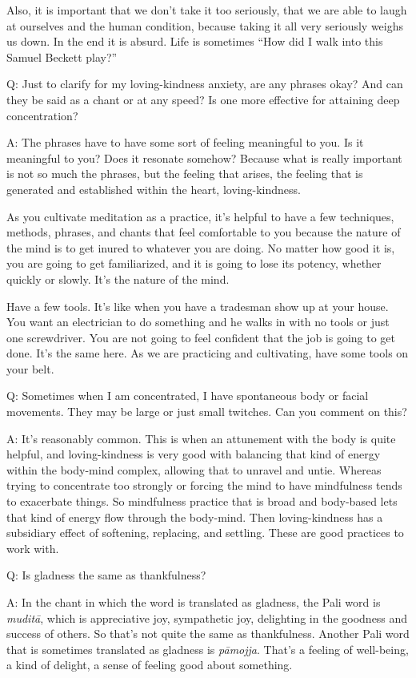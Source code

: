 Also, it is important that we don’t take it too seriously, that we are
able to laugh at ourselves and the human condition, because taking it
all very seriously weighs us down. In the end it is absurd. Life is
sometimes “How did I walk into this Samuel Beckett play?”

\qaspace
Q: Just to clarify for my loving-kindness anxiety, are any phrases okay?
And can they be said as a chant or at any speed? Is one more effective
for attaining deep concentration?

\qaspace
A: The phrases have to have some sort of feeling meaningful to you. Is
it meaningful to you? Does it resonate somehow? Because what is really
important is not so much the phrases, but the feeling that arises, the
feeling that is generated and established within the heart,
loving-kindness.

As you cultivate meditation as a practice, it’s helpful to have a few
techniques, methods, phrases, and chants that feel comfortable to you
because the nature of the mind is to get inured to whatever you are
doing. No matter how good it is, you are going to get familiarized, and
it is going to lose its potency, whether quickly or slowly. It’s the
nature of the mind.

Have a few tools. It’s like when you have a tradesman show up at your
house. You want an electrician to do something and he walks in with no
tools or just one screwdriver. You are not going to feel confident that
the job is going to get done. It’s the same here. As we are practicing
and cultivating, have some tools on your belt.

\qaspace
Q: Sometimes when I am concentrated, I have spontaneous body or facial
movements. They may be large or just small twitches. Can you comment on
this?

\qaspace
A: It’s reasonably common. This is when an attunement with the body is
quite helpful, and loving-kindness is very good with balancing that kind
of energy within the body-mind complex, allowing that to unravel and
untie. Whereas trying to concentrate too strongly or forcing the mind to
have mindfulness tends to exacerbate things. So mindfulness practice
that is broad and body-based lets that kind of energy flow through the
body-mind. Then loving-kindness has a subsidiary effect of softening,
replacing, and settling. These are good practices to work with.

\qaspace
Q: Is gladness the same as thankfulness?

\qaspace
A: In the chant in which the word is translated as gladness, the Pali
word is \emph{muditā}, which is appreciative joy, sympathetic joy,
delighting in the goodness and success of others. So that’s not quite
the same as thankfulness. Another Pali word that is sometimes translated
as gladness is \emph{pāmojja}. That’s a feeling of well-being, a kind of
delight, a sense of feeling good about something.

